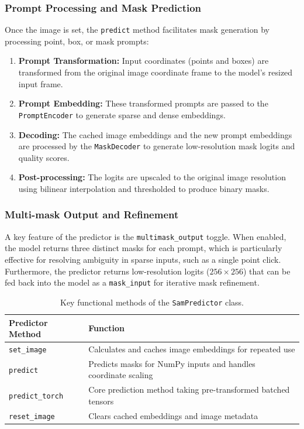 \subsubsection{Prompt Processing and Mask Prediction}
Once the image is set, the \texttt{predict} method facilitates mask generation by processing point, box, or mask prompts:

\begin{enumerate}
	\item \textbf{Prompt Transformation:} Input coordinates (points and boxes) are transformed from the original image coordinate frame to the model's resized input frame.
	
	\item \textbf{Prompt Embedding:} These transformed prompts are passed to the \texttt{PromptEncoder} to generate sparse and dense embeddings.
	
	\item \textbf{Decoding:} The cached image embeddings and the new prompt embeddings are processed by the \texttt{MaskDecoder} to generate low-resolution mask logits and quality scores.
	
	\item \textbf{Post-processing:} The logits are upscaled to the original image resolution using bilinear interpolation and thresholded to produce binary masks.
\end{enumerate}

\subsubsection{Multi-mask Output and Refinement}
A key feature of the predictor is the \texttt{multimask\_output} toggle. When enabled, the model returns three distinct masks for each prompt, which is particularly effective for resolving ambiguity in sparse inputs, such as a single point click. Furthermore, the predictor returns low-resolution logits ($256 \times 256$) that can be fed back into the model as a \texttt{mask\_input} for iterative mask refinement.

\begin{table}[H]
	\centering
	\begin{tabular}{|l|p{10cm}|} 
		\hline 
		\textbf{Predictor Method} & \textbf{Function} \\ \hline
		\texttt{set\_image} & Calculates and caches image embeddings for repeated use \\ \hline
		\texttt{predict} & Predicts masks for NumPy inputs and handles coordinate scaling \\ \hline
		\texttt{predict\_torch} & Core prediction method taking pre-transformed batched tensors \\ \hline
		\texttt{reset\_image} & Clears cached embeddings and image metadata \\ \hline
	\end{tabular}
	\caption{Key functional methods of the \texttt{SamPredictor} class.}
\end{table}

